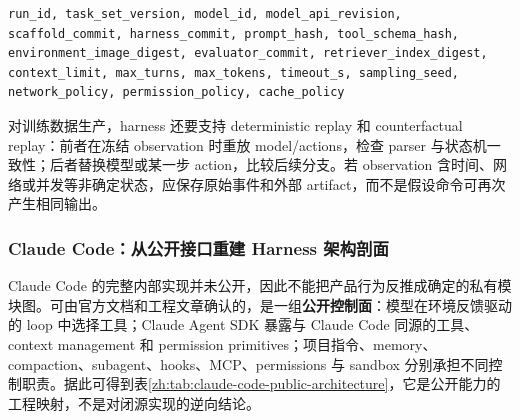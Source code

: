 \documentclass[10pt,a4paper,UTF8,fontset=none]{ctexart}
\begin{document}
\begin{lstlisting}[style=codeblock,caption={Harness run manifest 的最小复现信息},label={zh:lst:harness-manifest}]
run_id, task_set_version, model_id, model_api_revision,
scaffold_commit, harness_commit, prompt_hash, tool_schema_hash,
environment_image_digest, evaluator_commit, retriever_index_digest,
context_limit, max_turns, max_tokens, timeout_s, sampling_seed,
network_policy, permission_policy, cache_policy
\end{lstlisting}

对训练数据生产，harness 还要支持 deterministic replay 和 counterfactual replay：前者在冻结 observation 时重放 model/actions，检查 parser 与状态机一致性；后者替换模型或某一步 action，比较后续分支。若 observation 含时间、网络或并发等非确定状态，应保存原始事件和外部 artifact，而不是假设命令可再次产生相同输出。

\subsubsection{Claude Code：从公开接口重建 Harness 架构剖面}

Claude Code 的完整内部实现并未公开，因此不能把产品行为反推成确定的私有模块图。可由官方文档和工程文章确认的，是一组\textbf{公开控制面}：模型在环境反馈驱动的 loop 中选择工具；Claude Agent SDK 暴露与 Claude Code 同源的工具、context management 和 permission primitives；项目指令、memory、compaction、subagent、hooks、MCP、permissions 与 sandbox 分别承担不同控制职责\cite{zh:anthropic2024agents,zh:anthropic2025bestpractices,zh:anthropic2025autonomy}。据此可得到表\ref{zh:tab:claude-code-public-architecture}，它是公开能力的工程映射，不是对闭源实现的逆向结论。
\end{document}
